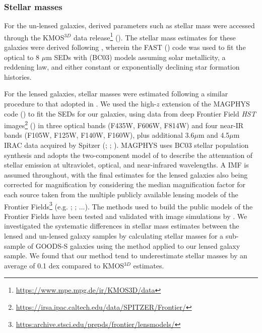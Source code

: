 \documentclass[usenatbib]{mnras} %
\begin{document}
\subsubsection{Stellar masses}

For the un-lensed galaxies, derived parameters such as stellar mass were accessed through the KMOS$^{3D}$ data release\footnote{\url{https://www.mpe.mpg.de/ir/KMOS3D/data}} (\citealt{Wisnioski_2019}). The stellar mass estimates for these galaxies were derived following \cite{Wuyts_2011}, wherein the FAST (\citealt{Kriek_2009}) code was used to fit the optical to 8 $\mu$m SEDs with \cite{Bruzual_2003} (BC03) models assuming solar metallicity, a \cite{Calzetti_2000} reddening law, and either constant or exponentially declining star formation histories. 

For the lensed galaxies, stellar masses were estimated following a similar procedure to that adopted in \cite{Curti_2020}. We used the high-$z$ extension of the \textsc{MAGPHYS} code (\citealt{deCunha_2015}) to fit the SEDs for our galaxies, using data from deep Frontier Field \emph{HST} images\footnote{\url{https://irsa.ipac.caltech.edu/data/SPITZER/Frontier/}} (\citealt{Lotz_2017}) in three optical bands (F435W, F606W, F814W) and four near-IR bands (F105W, F125W, F140W, F160W), plus additional  3.6$\mu$m and 4.5$\mu$m IRAC data acquired by Spitzer (\citealt{Castellano_2016}; \citealt{DiCriscienzo_2017}; \citealt{Bradac_2019}). MAGPHYS uses BC03 stellar population synthesis and adopts the two-component model of \cite{Charlot_2000} to describe the attenuation of stellar emission at  ultraviolet, optical, and near-infrared wavelengths. A \cite{Chabrier_2003} IMF is assumed throughout, with the final estimates for the lensed galaxies also being corrected for magnification by considering the median magnification factor for each source taken from the multiple publicly available lensing models of the Frontier Fields\footnote{\url{https:archive.stsci.edu/prepds/frontier/lensmodels/}} (e.g. \citealt{Zitrin_2013}; \citealt{Caminha_2017}; \citealt{Jauzac_2016}...). The methods used to build the public models of the Frontier Fields have been tested and validated with image simulations by \cite{Meneghetti_2017}. We investigated the systematic differences in stellar mass estimates between the lensed and un-lensed galaxy samples by calculating stellar masses for a sub-sample of GOODS-S galaxies using the method applied to our lensed galaxy sample. We found that our method tend to underestimate stellar masses by an average of 0.1 dex compared to KMOS$^{3D}$ estimates.
\end{document}
